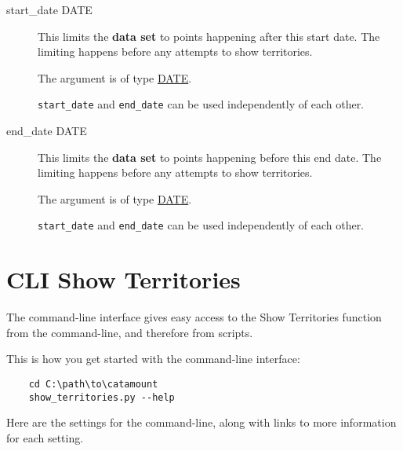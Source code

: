 \begin{description}
\item[start\_date DATE]
\hypertarget{territory-start-date}{}

This limits the \textbf{data set} to points happening after this start
date. The limiting happens before any attempts to show territories.

The argument is of type \hyperlink{argument-type-date}{DATE}.

\texttt{start\_date} and \texttt{end\_date} can be used independently of
each other.

\item[end\_date DATE]
\hypertarget{territory-end-date}{}

This limits the \textbf{data set} to points happening before this end
date. The limiting happens before any attempts to show territories.

The argument is of type \hyperlink{argument-type-date}{DATE}.

\texttt{start\_date} and \texttt{end\_date} can be used independently of
each other.

\end{description}


\section{CLI Show Territories}

The command-line interface gives easy access to the Show Territories
function from the command-line, and therefore from scripts.

This is how you get started with the command-line interface:

\begin{verbatim}
    cd C:\path\to\catamount
    show_territories.py --help
\end{verbatim}

Here are the settings for the command-line, along with links to
more information for each setting.

